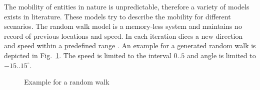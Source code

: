 \documentclass[master,english]{hgbthesis}
\begin{document}
The mobility of entities in nature is unpredictable, therefore a variety of models exists in literature. These models try to describe the mobility for different scenarios. The random walk model is a memory-less system and maintains no record of previous locations and speed. In each iteration dices a new direction and speed within a predefined range \cite{Camp2002}. An example for a generated random walk is depicted in Fig.\ \ref{fig:randomwalk}. The speed is limited to the interval $0..5$ and angle is limited to $-15..15^\circ$.

















\begin{figure}

	\centering


	\caption{Example for a random walk}

	\label{fig:randomwalk}

\end{figure}
\end{document}
